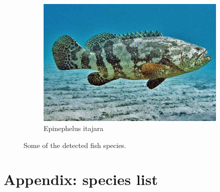 \documentclass[10pt]{article}
\begin{document}
\begin{figure}[h]
     \hfill
     \begin{subfigure}[b]{0.45\textwidth}
         \centering
         \includegraphics[width=\textwidth]{images/epinephelus_itajara.jpg}
         \caption{Epinephelus itajara}
     \end{subfigure}
     \caption{Some of the detected fish species.}
\end{figure}

\clearpage

\section*{Appendix: species list}

\begin{landscape}

\end{landscape}
\end{document}
